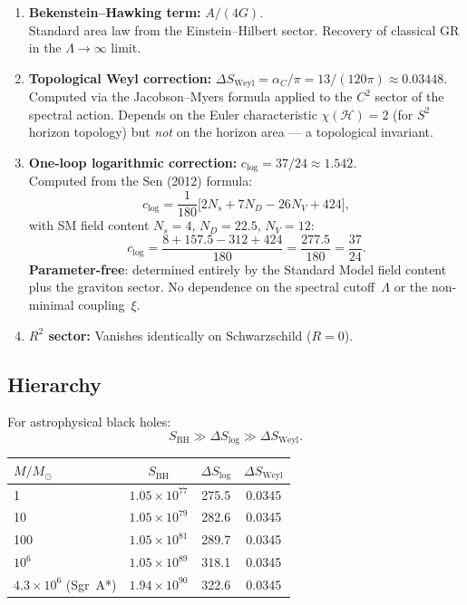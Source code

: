 \documentclass[11pt,a4paper]{article}
\begin{document}
\begin{enumerate}
  \item \textbf{Bekenstein--Hawking term:} $A/(4G)$.\\
  Standard area law from the Einstein--Hilbert sector.
  Recovery of classical GR in the $\Lambda \to \infty$ limit.

  \item \textbf{Topological Weyl correction:}
  $\Delta S_{\mathrm{Weyl}} = \alpha_C/\pi = 13/(120\pi) \approx 0.03448$.\\
  Computed via the Jacobson--Myers formula applied to the $C^2$ sector of the spectral action.
  Depends on the Euler characteristic $\chi(\mathcal{H}) = 2$ (for $S^2$ horizon topology)
  but \emph{not} on the horizon area --- a topological invariant.

  \item \textbf{One-loop logarithmic correction:}
  $c_{\log} = 37/24 \approx 1.542$.\\
  Computed from the Sen (2012) formula:
  \[
    c_{\log} = \frac{1}{180}\bigl[2 N_s + 7 N_D - 26 N_V + 424\bigr],
  \]
  with SM field content $N_s = 4$, $N_D = 22.5$, $N_V = 12$:
  \[
    c_{\log} = \frac{8 + 157.5 - 312 + 424}{180}
    = \frac{277.5}{180} = \frac{37}{24}.
  \]
  \textbf{Parameter-free}: determined entirely by the Standard Model field content
  plus the graviton sector. No dependence on the spectral cutoff~$\Lambda$
  or the non-minimal coupling~$\xi$.

  \item \textbf{$R^2$ sector:} Vanishes identically on Schwarzschild ($R = 0$).
\end{enumerate}

\subsection{Hierarchy}

For astrophysical black holes:
\[
  S_{\mathrm{BH}} \gg \Delta S_{\log} \gg \Delta S_{\mathrm{Weyl}}.
\]

\begin{center}
\begin{tabular}{lccc}
\toprule
$M/M_\odot$ & $S_{\mathrm{BH}}$ & $\Delta S_{\log}$ & $\Delta S_{\mathrm{Weyl}}$ \\
\midrule
1         & $1.05 \times 10^{77}$ & 275.5 & 0.0345 \\
10        & $1.05 \times 10^{79}$ & 282.6 & 0.0345 \\
100       & $1.05 \times 10^{81}$ & 289.7 & 0.0345 \\
$10^6$    & $1.05 \times 10^{89}$ & 318.1 & 0.0345 \\
$4.3\times10^6$ (Sgr~A*) & $1.94 \times 10^{90}$ & 322.6 & 0.0345 \\
\bottomrule
\end{tabular}
\end{center}
\end{document}
